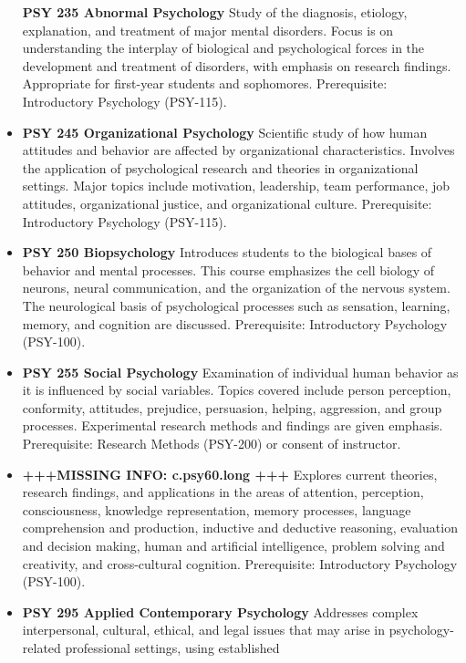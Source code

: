 \documentclass[
  letterpaper,
]{scrbook}
\begin{document}
\begin{itemize}
  \textbf{PSY 235 Abnormal Psychology} Study of the diagnosis, etiology,
  explanation, and treatment of major mental disorders. Focus is on
  understanding the interplay of biological and psychological forces in
  the development and treatment of disorders, with emphasis on research
  findings. Appropriate for first-year students and sophomores.
  Prerequisite: Introductory Psychology (PSY-115).\\
\item
  \textbf{PSY 245 Organizational Psychology} Scientific study of how
  human attitudes and behavior are affected by organizational
  characteristics. Involves the application of psychological research
  and theories in organizational settings. Major topics include
  motivation, leadership, team performance, job attitudes,
  organizational justice, and organizational culture. Prerequisite:
  Introductory Psychology (PSY-115).
\item
  \textbf{PSY 250 Biopsychology} Introduces students to the biological
  bases of behavior and mental processes. This course emphasizes the
  cell biology of neurons, neural communication, and the organization of
  the nervous system. The neurological basis of psychological processes
  such as sensation, learning, memory, and cognition are discussed.
  Prerequisite: Introductory Psychology (PSY-100).\\
\item
  \textbf{PSY 255 Social Psychology} Examination of individual human
  behavior as it is influenced by social variables. Topics covered
  include person perception, conformity, attitudes, prejudice,
  persuasion, helping, aggression, and group processes. Experimental
  research methods and findings are given emphasis. Prerequisite:
  Research Methods (PSY-200) or consent of instructor.
\item
  \textbf{+++MISSING INFO: c.psy60.long +++} Explores current theories,
  research findings, and applications in the areas of attention,
  perception, consciousness, knowledge representation, memory processes,
  language comprehension and production, inductive and deductive
  reasoning, evaluation and decision making, human and artificial
  intelligence, problem solving and creativity, and cross-cultural
  cognition. Prerequisite: Introductory Psychology (PSY-100).
\item
  \textbf{PSY 295 Applied Contemporary Psychology} Addresses complex
  interpersonal, cultural, ethical, and legal issues that may arise in
  psychology-related professional settings, using established

\end{itemize}
\end{document}
